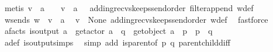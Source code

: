 \begin{isabellebody}
\ {\isacharparenleft}{\kern0pt}metis\ {\isacartoucheopen}v\ {\isasymsqdot}\ a\ {\isacharhash}{\kern0pt}\ {\isasymepsilon}\ {\isacharequal}{\kern0pt}\ {\isacharparenleft}{\kern0pt}v\ {\isasymsqdot}\ a\ {\isacharhash}{\kern0pt}\ {\isasymepsilon}{\isacharparenright}{\kern0pt}{\isasymdown}\isactrlsub {\isacharbang}{\kern0pt}{\isacartoucheclose}\ adding{\isacharunderscore}{\kern0pt}recvs{\isacharunderscore}{\kern0pt}keeps{\isacharunderscore}{\kern0pt}send{\isacharunderscore}{\kern0pt}order\ filter{\isacharunderscore}{\kern0pt}append\ w{\isacharunderscore}{\kern0pt}def{\isacharparenright}{\kern0pt}\isanewline
\ \ \isamarkupfalse%
\ \isamarkupfalse%
\ w{\isacharunderscore}{\kern0pt}sends{\isacharunderscore}{\kern0pt}{}{\isacharcolon}{\kern0pt}\ {\isachardoublequoteopen}w\ {\isacharequal}{\kern0pt}\ {\isacharparenleft}{\kern0pt}{\isacharquery}{\kern0pt}v{\isacharprime}{\kern0pt}{\isacharparenright}{\kern0pt}{\isasymdown}\isactrlsub {\isacharbang}{\kern0pt}\ {\isasymsqdot}\ {\isacharbrackleft}{\kern0pt}a{\isacharbrackright}{\kern0pt}{\isachardoublequoteclose}\ \isamarkupfalse%
\ {\isacartoucheopen}v\ {\isasymin}\ {\isasymT}\isactrlbsub None\isactrlesub {\isasymdownharpoonright}\isactrlsub {\isacharbang}{\kern0pt}{\isacartoucheclose}\ adding{\isacharunderscore}{\kern0pt}recvs{\isacharunderscore}{\kern0pt}keeps{\isacharunderscore}{\kern0pt}send{\isacharunderscore}{\kern0pt}order\ w{\isacharunderscore}{\kern0pt}def\ \isamarkupfalse%
\ fastforce\isanewline
\ \ \isamarkupfalse%
\ a{\isacharunderscore}{\kern0pt}facts{\isacharcolon}{\kern0pt}\ {\isachardoublequoteopen}is{\isacharunderscore}{\kern0pt}output\ a\ {\isasymand}\ get{\isacharunderscore}{\kern0pt}actor\ a\ {\isacharequal}{\kern0pt}\ q\ {\isasymand}\ get{\isacharunderscore}{\kern0pt}object\ a\ {\isacharequal}{\kern0pt}\ p\ {\isasymand}\ p\ {\isasymnoteq}\ q{\isachardoublequoteclose}\ \isamarkupfalse%
\ a{\isacharunderscore}{\kern0pt}def\ is{\isacharunderscore}{\kern0pt}output{\isachardot}{\kern0pt}simps{\isacharparenleft}{\kern0pt}{}{\isacharparenright}{\kern0pt}\ \isamarkupfalse%
\ {\isacharparenleft}{\kern0pt}simp\ add{\isacharcolon}{\kern0pt}\ {\isacartoucheopen}is{\isacharunderscore}{\kern0pt}parent{\isacharunderscore}{\kern0pt}of\ p\ q{\isacartoucheclose}\ parent{\isacharunderscore}{\kern0pt}child{\isacharunderscore}{\kern0pt}diff{\isacharparenright}{\kern0pt}\isanewline
\ \ \isamarkupfalse%
\ \isamarkupfalse%

\end{isabellebody}
